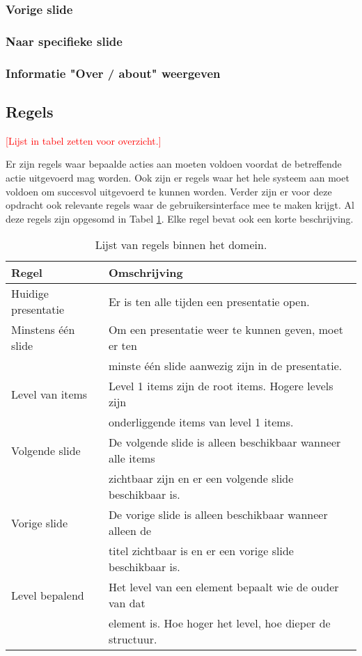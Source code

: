 \documentclass[a4paper]{article}
\newcommand{\todo}[1]{\textcolor{red}{[#1]}}
\begin{document}
\subsubsection{Vorige slide}

\subsubsection{Naar specifieke slide}

\subsubsection{Informatie "Over / about" weergeven}

\subsection{Regels}
\label{sub:regels}
\todo{Lijst in tabel zetten voor overzicht.}

Er zijn regels waar bepaalde acties aan moeten voldoen voordat de betreffende actie uitgevoerd mag worden. Ook zijn er regels waar het hele systeem aan moet voldoen om succesvol uitgevoerd te kunnen worden. Verder zijn er voor deze opdracht ook relevante regels waar de gebruikersinterface mee te maken krijgt. Al deze regels zijn opgesomd in Tabel \ref{table:regels}. Elke regel bevat ook een korte beschrijving.

\begin{table}[!h]
\centering
	\begin{tabular}{ll}
	\toprule
 	Regel & Omschrijving \\ \midrule
 	Huidige presentatie & Er is ten alle tijden een presentatie open.\\
 	Minstens \'{e}\'{e}n slide & Om een presentatie weer te kunnen geven, moet er ten \\& minste \'{e}\'{e}n slide aanwezig zijn in de presentatie.\\
 	Level van items & Level 1 items zijn de root items. Hogere levels zijn \\& onderliggende items van level 1 items.\\
 	Volgende slide & De volgende slide is alleen beschikbaar wanneer alle items \\& zichtbaar zijn en er een volgende slide beschikbaar is.\\
 	Vorige slide & De vorige slide is alleen beschikbaar wanneer alleen de \\& titel zichtbaar is en er een vorige slide beschikbaar is.\\
 	Level bepalend & Het level van een element bepaalt wie de ouder van dat \\& element is. Hoe hoger het level, hoe dieper de structuur.\\
  	\bottomrule
	\end{tabular}
\caption{Lijst van regels binnen het domein.}
\label{table:regels}
\end{table}
\end{document}
